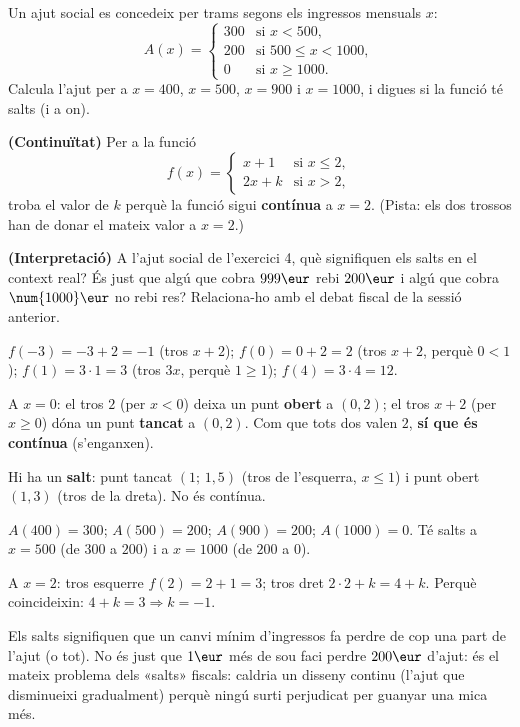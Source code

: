 \begin{exercicis}
\begin{exlist}
  \item Un ajut social es concedeix per trams segons els ingressos mensuals $x$:
        \[
        A(x)=
        \begin{cases}
        300 & \text{si } x<500,\\[2pt]
        200 & \text{si } 500\le x<1000,\\[2pt]
        0 & \text{si } x\ge 1000.
        \end{cases}
        \]
        Calcula l'ajut per a $x=400$, $x=500$, $x=900$ i $x=1000$, i digues si la
        funció té salts (i a on).
  \item \textbf{(Continuïtat)} Per a la funció
        \[
        f(x)=
        \begin{cases}
        x+1 & \text{si } x\le 2,\\[2pt]
        2x+k & \text{si } x>2,
        \end{cases}
        \]
        troba el valor de $k$ perquè la funció sigui \textbf{contínua} a $x=2$.
        (Pista: els dos trossos han de donar el mateix valor a $x=2$.)
  \item \textbf{(Interpretació)} A l'ajut social de l'exercici 4, què signifiquen els
        salts en el context real? És just que algú que cobra $999\eur$ rebi $200\eur$
        i algú que cobra $\num{1000}\eur$ no rebi res? Relaciona-ho amb el debat fiscal
        de la sessió anterior.
\end{exlist}
\end{exercicis}

\begin{solucions}
\begin{sollist}
  \item $f(-3)=-3+2=-1$ (tros $x+2$); $f(0)=0+2=2$ (tros $x+2$, perquè $0<1$);
        $f(1)=3\cdot 1=3$ (tros $3x$, perquè $1\ge 1$); $f(4)=3\cdot 4=12$.
  \item A $x=0$: el tros $2$ (per $x<0$) deixa un punt \textbf{obert} a $(0,2)$; el
        tros $x+2$ (per $x\ge 0$) dóna un punt \textbf{tancat} a $(0,2)$. Com que tots
        dos valen $2$, \textbf{sí que és contínua} (s'enganxen).
  \item Hi ha un \textbf{salt}: punt tancat $(1;\,1,5)$ (tros de l'esquerra, $x\le 1$)
        i punt obert $(1,3)$ (tros de la dreta). No és contínua.
  \item $A(400)=300$; $A(500)=200$; $A(900)=200$; $A(1000)=0$. Té salts a $x=500$
        (de $300$ a $200$) i a $x=\num{1000}$ (de $200$ a $0$).
  \item A $x=2$: tros esquerre $f(2)=2+1=3$; tros dret $2\cdot 2+k=4+k$. Perquè
        coincideixin: $4+k=3 \Rightarrow k=-1$.
  \item Els salts signifiquen que un canvi mínim d'ingressos fa perdre de cop una part
        de l'ajut (o tot). No és just que $1\eur$ més de sou faci perdre $200\eur$
        d'ajut: és el mateix problema dels «salts» fiscals: caldria un disseny continu
        (l'ajut que disminueixi gradualment) perquè ningú surti perjudicat per guanyar
        una mica més.
\end{sollist}
\end{solucions}
